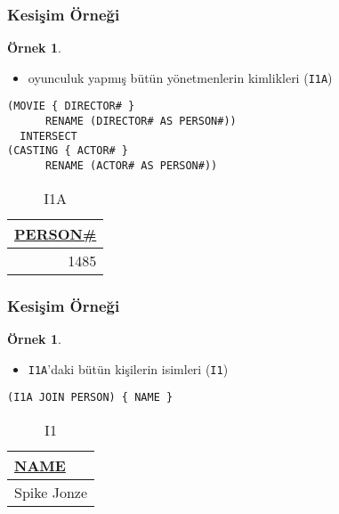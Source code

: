 \documentclass[dvipsnames]{beamer}
\theoremstyle{definition}
\theoremstyle{example}
\newtheorem{ornek}[theorem]{Örnek}
\theoremstyle{plain}
\begin{document}
\begin{frame}[fragile]
  \frametitle{Kesişim Örneği}

  \begin{ornek}
    \begin{itemize}
      \item oyunculuk yapmış bütün yönetmenlerin kimlikleri (\texttt{I1A})
    \end{itemize}

    \begin{lstlisting}
(MOVIE { DIRECTOR# }
      RENAME (DIRECTOR# AS PERSON#))
  INTERSECT
(CASTING { ACTOR# }
      RENAME (ACTOR# AS PERSON#))
    \end{lstlisting}

    \pause
    \vspace{-10pt}
    \begin{tiny}
    \begin{table}
      \caption{I1A}
      \begin{tabular}{|r|}\hline
\underline{PERSON\#}\\[2pt]\hline\hline
                1485\\\hline
      \end{tabular}
    \end{table}
    \end{tiny}
  \end{ornek}
\end{frame}

\begin{frame}[fragile]
  \frametitle{Kesişim Örneği}

  \begin{ornek}
    \begin{itemize}
      \item \texttt{I1A}'daki bütün kişilerin isimleri (\texttt{I1})
    \end{itemize}

    \begin{lstlisting}
(I1A JOIN PERSON) { NAME }
    \end{lstlisting}

    \pause
    \vspace{-10pt}
    \begin{tiny}
    \begin{table}
      \caption{I1}
      \begin{tabular}{|l|}\hline
\underline{NAME}\\[2pt]\hline\hline
Spike Jonze     \\\hline
      \end{tabular}
    \end{table}
    \end{tiny}
  \end{ornek}
\end{frame}
\end{document}
